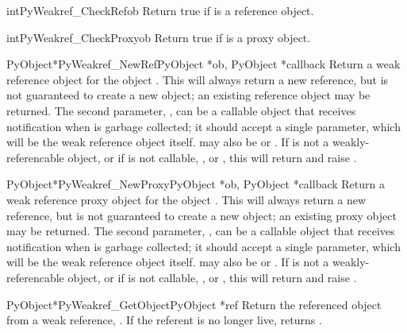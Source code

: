 \begin{cfuncdesc}{int}{PyWeakref_CheckRef}{ob}
  Return true if  is a reference object.
\end{cfuncdesc}

\begin{cfuncdesc}{int}{PyWeakref_CheckProxy}{ob}
  Return true if  is a proxy object.
\end{cfuncdesc}

\begin{cfuncdesc}{PyObject*}{PyWeakref_NewRef}{PyObject *ob,
                                               PyObject *callback}
  Return a weak reference object for the object .  This will
  always return a new reference, but is not guaranteed to create a new
  object; an existing reference object may be returned.  The second
  parameter, , can be a callable object that receives
  notification when  is garbage collected; it should accept a
  single parameter, which will be the weak reference object itself.
   may also be  or \NULL{}.  If 
  is not a weakly-referencable object, or if  is not
  callable, , or \NULL{}, this will return \NULL{} and
  raise .
\end{cfuncdesc}

\begin{cfuncdesc}{PyObject*}{PyWeakref_NewProxy}{PyObject *ob,
                                                 PyObject *callback}
  Return a weak reference proxy object for the object .  This
  will always return a new reference, but is not guaranteed to create
  a new object; an existing proxy object may be returned.  The second
  parameter, , can be a callable object that receives
  notification when  is garbage collected; it should accept a
  single parameter, which will be the weak reference object itself.
   may also be  or \NULL{}.  If  is not
  a weakly-referencable object, or if  is not callable,
  , or \NULL{}, this will return \NULL{} and raise
  .
\end{cfuncdesc}

\begin{cfuncdesc}{PyObject*}{PyWeakref_GetObject}{PyObject *ref}
  Return the referenced object from a weak reference, .  If
  the referent is no longer live, returns .
\end{cfuncdesc}

